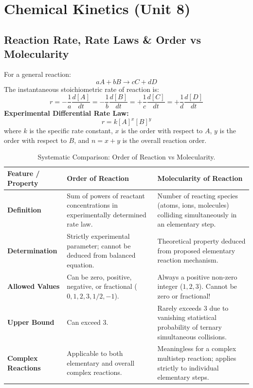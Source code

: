 \documentclass[10pt,a4paper]{article}
\begin{document}
\section{Chemical Kinetics (Unit 8)}

\subsection{Reaction Rate, Rate Laws \& Order vs Molecularity}
For a general reaction:
\begin{equation}
  aA + bB \longrightarrow cC + dD
\end{equation}
The instantaneous stoichiometric rate of reaction is:
\begin{equation}
  r = -\frac{1}{a}\frac{d[A]}{dt} = -\frac{1}{b}\frac{d[B]}{dt} = +\frac{1}{c}\frac{d[C]}{dt} = +\frac{1}{d}\frac{d[D]}{dt}
\end{equation}
\textbf{Experimental Differential Rate Law:}
\begin{equation}
  r = k [A]^x [B]^y
\end{equation}
where $k$ is the specific rate constant, $x$ is the order with respect to $A$, $y$ is the order with respect to $B$, and $n = x + y$ is the overall reaction order.

\begin{table}[htbp]
\centering
\small
\renewcommand{\arraystretch}{1.3}
\begin{tabularx}{\textwidth}{p{3.5cm} p{5.5cm} p{5.5cm}}
\toprule
\textbf{Feature / Property} & \textbf{Order of Reaction} & \textbf{Molecularity of Reaction} \\
\midrule
\textbf{Definition} & Sum of powers of reactant concentrations in experimentally determined rate law. & Number of reacting species (atoms, ions, molecules) colliding simultaneously in an elementary step. \\
\textbf{Determination} & Strictly experimental parameter; cannot be deduced from balanced equation. & Theoretical property deduced from proposed elementary reaction mechanism. \\
\textbf{Allowed Values} & Can be zero, positive, negative, or fractional ($0, 1, 2, 3, 1/2, -1$). & Always a positive non-zero integer ($1, 2, 3$). Cannot be zero or fractional! \\
\textbf{Upper Bound} & Can exceed 3. & Rarely exceeds 3 due to vanishing statistical probability of ternary simultaneous collisions. \\
\textbf{Complex Reactions} & Applicable to both elementary and overall complex reactions. & Meaningless for a complex multistep reaction; applies strictly to individual elementary steps. \\
\bottomrule
\end{tabularx}
\caption{Systematic Comparison: Order of Reaction vs Molecularity.}
\end{table}
\end{document}
